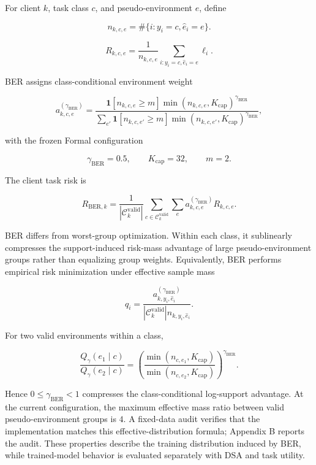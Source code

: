 For client \(k\), task class \(c\), and pseudo-environment \(e\), define

\[
n_{k,c,e}=\#\{i:y_i=c,\hat e_i=e\}.
\]

\[
R_{k,c,e}=\frac1{n_{k,c,e}}\sum_{i:y_i=c,\hat e_i=e}\ell_i.
\]

BER assigns class-conditional environment weight

\[
a^{(\gamma_{\mathrm{BER}})}_{k,c,e}
=
\frac{
\mathbf 1[n_{k,c,e}\ge m]
\min(n_{k,c,e},K_{\mathrm{cap}})^{\gamma_{\mathrm{BER}}}
}{
\sum_{e'}
\mathbf 1[n_{k,c,e'}\ge m]
\min(n_{k,c,e'},K_{\mathrm{cap}})^{\gamma_{\mathrm{BER}}}
},
\]

with the frozen Formal configuration

\[
\gamma_{\mathrm{BER}}=0.5,\qquad K_{\mathrm{cap}}=32,\qquad m=2.
\]

The client task risk is

\[
R_{\mathrm{BER},k}
=
\frac1{|\mathcal C_k^{\mathrm{valid}}|}
\sum_{c\in\mathcal C_k^{\mathrm{valid}}}
\sum_e a^{(\gamma_{\mathrm{BER}})}_{k,c,e}R_{k,c,e}.
\]

BER differs from worst-group optimization. Within each class, it sublinearly compresses the support-induced risk-mass advantage of large pseudo-environment groups rather than equalizing group weights. Equivalently, BER performs empirical risk minimization under effective sample mass

\[
q_i=
\frac{a^{(\gamma_{\mathrm{BER}})}_{k,y_i,\hat e_i}}
{|\mathcal C_k^{\mathrm{valid}}|n_{k,y_i,\hat e_i}}.
\]

For two valid environments within a class,

\[
\frac{Q_\gamma(e_1\mid c)}{Q_\gamma(e_2\mid c)}
=
\left(
\frac{\min(n_{c,e_1},K_{\mathrm{cap}})}
{\min(n_{c,e_2},K_{\mathrm{cap}})}
\right)^{\gamma_{\mathrm{BER}}}.
\]

Hence \(0\le\gamma_{\mathrm{BER}}<1\) compresses the class-conditional log-support advantage. At the current configuration, the maximum effective mass ratio between valid pseudo-environment groups is \(4\). A fixed-data audit verifies that the implementation matches this effective-distribution formula; Appendix B reports the audit. These properties describe the training distribution induced by BER, while trained-model behavior is evaluated separately with DSA and task utility.
